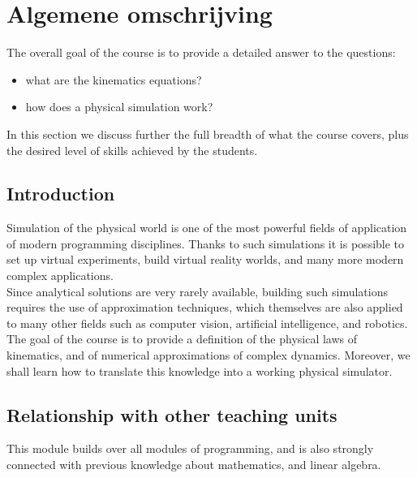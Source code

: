 \section{Algemene omschrijving}
	The overall goal of the course is to provide a detailed answer to the questions:	
	\begin{itemize}
	\item what are the kinematics equations?
	\item how does a physical simulation work?
	\end{itemize}
	
	In this section we discuss further the full breadth of what the course covers, plus the desired level of skills achieved by the students. 
	
	\subsection{Introduction}
		Simulation of the physical world is one of the most powerful fields of application of modern programming disciplines. Thanks to such simulations it is possible to set up virtual experiments, build virtual reality worlds, and many more modern complex applications. \\
		
		Since analytical solutions are very rarely available, building such simulations requires the use of approximation techniques, which themselves are also applied to many other fields such as computer vision, artificial intelligence, and robotics. \\

		The goal of the course is to provide a definition of the physical laws of kinematics, and of numerical approximations of complex dynamics. Moreover, we shall learn how to translate this knowledge into a working physical simulator. \\
				
	\subsection{Relationship with other teaching units}
		This module builds over all modules of programming, and is also strongly connected with previous knowledge about mathematics, and linear algebra. \\
	
